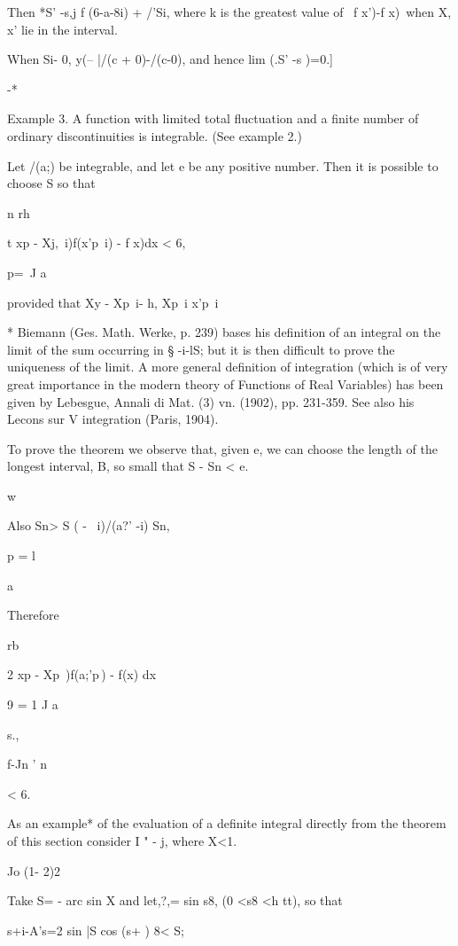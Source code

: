 Then *S' -s,j f (6-a-8i) + /'Si, where k is the greatest value of \ f
x')-f x)\, when X, x' lie in the interval.

When Si- 0, y(-- |/(c + 0)-/(c-0), and hence lim (.S' -s )=0.]

 -*

Example 3. A function with limited total fluctuation and a finite
number of ordinary discontinuities is integrable. (See example
2.)


Let /(a;) be integrable, and let e be any positive number. Then it is
possible to choose S so that

n rh

t xp - Xj,\ i)f(x'p\ i) - f x)dx < 6,

p=\ J a

provided that Xy - Xp\ i- h, Xp\ i x'p\ i%

* Biemann (Ges. Math. Werke, p. 239) bases his definition of an
integral on the limit of the sum occurring in § -i-lS; but it is then
difficult to prove the uniqueness of the limit. A more general
definition of integration (which is of very great importance in the
modern theory of Functions of Real Variables) has been given by
Lebesgue, Annali di Mat. (3) vn. (1902), pp. 231-359. See also his
Lecons sur V integration (Paris, 1904).

%
%

To prove the theorem we observe that, given e, we can choose the
length of the longest interval, B, so small that S - Sn < e.

w

Also Sn> S ( - \ i)/(a?' -i) Sn,

p = l

  a

Therefore

  rb

2 xp - Xp\ )f(a;'p\,) - f(x) dx

9 = 1 J a

 s.,

  f-Jn ' n

< 6.

As an example* of the evaluation of a definite integral directly from
the theorem of this section consider I " - j, where X<1.

Jo (1- 2)2

Take S= - arc sin X and let,?,= sin s8, (0 <s8 <h tt), so that

 s+i-A's=2 sin |S cos (s+ ) 8< S;

